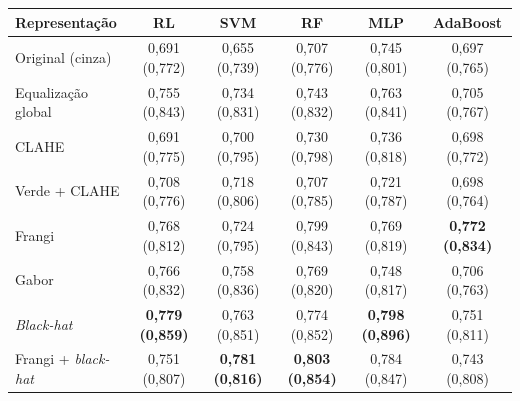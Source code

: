 \begin{tabular}{lccccc}
\toprule
Representação & RL & SVM & RF & MLP & AdaBoost \\
\midrule
Original (cinza) & 0,691 (0,772) & 0,655 (0,739) & 0,707 (0,776) & 0,745 (0,801) & 0,697 (0,765) \\
Equalização global & 0,755 (0,843) & 0,734 (0,831) & 0,743 (0,832) & 0,763 (0,841) & 0,705 (0,767) \\
CLAHE & 0,691 (0,775) & 0,700 (0,795) & 0,730 (0,798) & 0,736 (0,818) & 0,698 (0,772) \\
Verde + CLAHE & 0,708 (0,776) & 0,718 (0,806) & 0,707 (0,785) & 0,721 (0,787) & 0,698 (0,764) \\
\midrule
Frangi & 0,768 (0,812) & 0,724 (0,795) & 0,799 (0,843) & 0,769 (0,819) & \textbf{0,772 (0,834)} \\
Gabor & 0,766 (0,832) & 0,758 (0,836) & 0,769 (0,820) & 0,748 (0,817) & 0,706 (0,763) \\
\textit{Black-hat} & \textbf{0,779 (0,859)} & 0,763 (0,851) & 0,774 (0,852) & \textbf{0,798 (0,896)} & 0,751 (0,811) \\
Frangi + \textit{black-hat} & 0,751 (0,807) & \textbf{0,781 (0,816)} & \textbf{0,803 (0,854)} & 0,784 (0,847) & 0,743 (0,808) \\
\bottomrule
\end{tabular}
